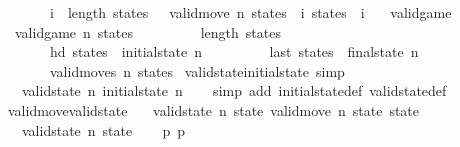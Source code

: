 \begin{isabellebody}
\ \ \ \ \ \ {\isacharparenleft}{\isasymforall}\ i\ {\isacharless}\ length\ states\ {\isacharminus}\ {}{\isachardot}\ valid{\isacharunderscore}move\ n\ {\isacharparenleft}states\ {\isacharbang}\ i{\isacharparenright}\ {\isacharparenleft}states\ {\isacharbang}\ {\isacharparenleft}i\ {\isacharplus}\ {}{\isacharparenright}{\isacharparenright}{\isacharparenright}{\isachardoublequoteclose}\isanewline
\isanewline
{}\isamarkupfalse%
\ valid{\isacharunderscore}game\ \isanewline
\ \ {\isachardoublequoteopen}valid{\isacharunderscore}game\ n\ states\ {\isasymlongleftrightarrow}\ \isanewline
\ \ \ \ \ \ \ length\ states\ {\isasymge}\ {}\ {\isasymand}\isanewline
\ \ \ \ \ \ \ hd\ states\ {\isacharequal}\ initial{\isacharunderscore}state\ n\ {\isasymand}\ \isanewline
\ \ \ \ \ \ \ last\ states\ {\isacharequal}\ final{\isacharunderscore}state\ n\ {\isasymand}\ \isanewline
\ \ \ \ \ \ \ valid{\isacharunderscore}moves\ n\ states{\isachardoublequoteclose}\isanewline
\isanewline
\isanewline
{}\isamarkupfalse%
\ valid{\isacharunderscore}state{\isacharunderscore}initial{\isacharunderscore}state\ {\isacharbrackleft}simp{\isacharbrackright}{\isacharcolon}\isanewline
\ \ \ {\isachardoublequoteopen}valid{\isacharunderscore}state\ n\ {\isacharparenleft}initial{\isacharunderscore}state\ n{\isacharparenright}{\isachardoublequoteclose}\isanewline
%
\isadelimproof
\ \ %
\endisadelimproof
%
\isatagproof
{}\isamarkupfalse%
\ {\isacharparenleft}simp\ add{\isacharcolon}\ initial{\isacharunderscore}state{\isacharunderscore}def\ valid{\isacharunderscore}state{\isacharunderscore}def{\isacharparenright}%
\endisatagproof
{\isafoldproof}%
%
\isadelimproof
\isanewline
%
\endisadelimproof
\isanewline
{}\isamarkupfalse%
\ valid{\isacharunderscore}move{\isacharunderscore}valid{\isacharunderscore}state{\isacharcolon}\isanewline
\ \ \ {\isachardoublequoteopen}valid{\isacharunderscore}state\ n\ state{\isachardoublequoteclose}\ {\isachardoublequoteopen}valid{\isacharunderscore}move\ n\ state\ state{\isacharprime}{\isachardoublequoteclose}\isanewline
\ \ \ {\isachardoublequoteopen}valid{\isacharunderscore}state\ n\ state{\isacharprime}{\isachardoublequoteclose}\isanewline
%
\isadelimproof
%
\endisadelimproof
%
\isatagproof
{}\isamarkupfalse%
{\isacharminus}\isanewline
\ \ \isamarkupfalse%
\ p{}\ p{}\isanewline

\end{isabellebody}
